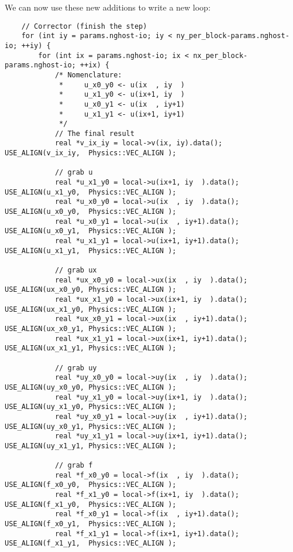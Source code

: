 \noindent We can now use these new additions to write a new loop:

{\tiny
\begin{lstlisting}
    // Corrector (finish the step)
    for (int iy = params.nghost-io; iy < ny_per_block-params.nghost-io; ++iy) {
        for (int ix = params.nghost-io; ix < nx_per_block-params.nghost-io; ++ix) {
            /* Nomenclature:
             *     u_x0_y0 <- u(ix  , iy  )
             *     u_x1_y0 <- u(ix+1, iy  )
             *     u_x0_y1 <- u(ix  , iy+1)
             *     u_x1_y1 <- u(ix+1, iy+1)
             */
            // The final result
            real *v_ix_iy = local->v(ix, iy).data();       USE_ALIGN(v_ix_iy,  Physics::VEC_ALIGN );

            // grab u
            real *u_x1_y0 = local->u(ix+1, iy  ).data();   USE_ALIGN(u_x1_y0,  Physics::VEC_ALIGN );
            real *u_x0_y0 = local->u(ix  , iy  ).data();   USE_ALIGN(u_x0_y0,  Physics::VEC_ALIGN );
            real *u_x0_y1 = local->u(ix  , iy+1).data();   USE_ALIGN(u_x0_y1,  Physics::VEC_ALIGN );
            real *u_x1_y1 = local->u(ix+1, iy+1).data();   USE_ALIGN(u_x1_y1,  Physics::VEC_ALIGN );

            // grab ux
            real *ux_x0_y0 = local->ux(ix  , iy  ).data(); USE_ALIGN(ux_x0_y0, Physics::VEC_ALIGN );
            real *ux_x1_y0 = local->ux(ix+1, iy  ).data(); USE_ALIGN(ux_x1_y0, Physics::VEC_ALIGN );
            real *ux_x0_y1 = local->ux(ix  , iy+1).data(); USE_ALIGN(ux_x0_y1, Physics::VEC_ALIGN );
            real *ux_x1_y1 = local->ux(ix+1, iy+1).data(); USE_ALIGN(ux_x1_y1, Physics::VEC_ALIGN );

            // grab uy
            real *uy_x0_y0 = local->uy(ix  , iy  ).data(); USE_ALIGN(uy_x0_y0, Physics::VEC_ALIGN );
            real *uy_x1_y0 = local->uy(ix+1, iy  ).data(); USE_ALIGN(uy_x1_y0, Physics::VEC_ALIGN );
            real *uy_x0_y1 = local->uy(ix  , iy+1).data(); USE_ALIGN(uy_x0_y1, Physics::VEC_ALIGN );
            real *uy_x1_y1 = local->uy(ix+1, iy+1).data(); USE_ALIGN(uy_x1_y1, Physics::VEC_ALIGN );

            // grab f
            real *f_x0_y0 = local->f(ix  , iy  ).data();   USE_ALIGN(f_x0_y0,  Physics::VEC_ALIGN );
            real *f_x1_y0 = local->f(ix+1, iy  ).data();   USE_ALIGN(f_x1_y0,  Physics::VEC_ALIGN );
            real *f_x0_y1 = local->f(ix  , iy+1).data();   USE_ALIGN(f_x0_y1,  Physics::VEC_ALIGN );
            real *f_x1_y1 = local->f(ix+1, iy+1).data();   USE_ALIGN(f_x1_y1,  Physics::VEC_ALIGN );


\end{lstlisting}}
